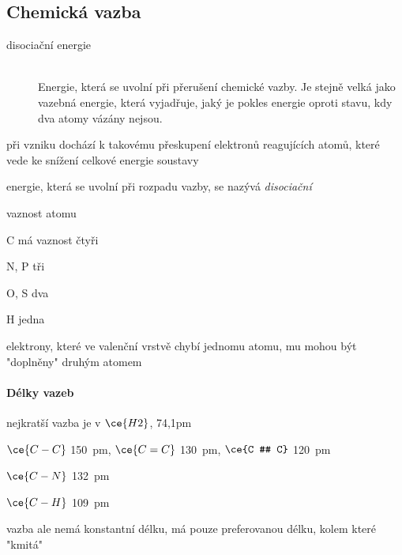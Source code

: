 \documentclass[DIV=8]{scrreprt}
\begin{document}
\subsection{Chemická vazba} \label{Chemická vazba}


\begin{description}
\item[disociační energie]\hfill \\
Energie, která se uvolní při přerušení chemické vazby. Je stejně velká jako vazebná energie, která vyjadřuje, jaký je pokles energie oproti stavu, kdy dva atomy vázány nejsou.

\end{description}


\begin{myItemize}[nosep]
    \item při vzniku dochází k takovému přeskupení elektronů reagujících atomů, které vede ke snížení celkové energie soustavy
    \item  energie, která se uvolní při rozpadu vazby, se nazývá \emph{disociační}
    \item vaznost atomu
\begin{myItemize}[nosep]
    \item C má vaznost čtyři
    \item N, P tři
    \item O, S dva
    \item H jedna
\end{myItemize}

    \item elektrony, které ve valenční vrstvě chybí jednomu atomu, mu mohou být "doplněny" druhým atomem
\end{myItemize}



\paragraph{Délky vazeb}
\begin{myItemize}[nosep]
    \item nejkratší vazba je v \(\ce{H2}\), 74,1pm
    \item \(\ce{C-C}\) \si{150 pm}, \(\ce{C = C}\) \si{130 pm}, \(\ce{C # C}\) \si{120 pm}
    \item \(\ce{C-N}\) \si{132 pm}
    \item \(\ce{C - H}\) \si{109 pm}
    \item vazba ale nemá konstantní délku, má pouze preferovanou délku, kolem které "kmitá"
\end{myItemize}
\end{document}
